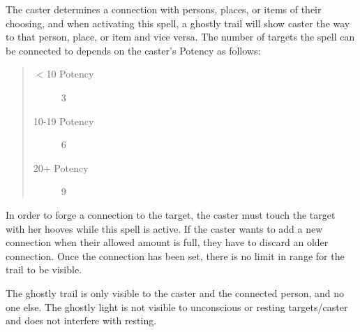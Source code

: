 \documentclass[11pt,a4paper,twocolumn]{book}
\begin{document}
\medskip

The caster determines a connection with persons, places, or items of their choosing, and when activating this spell, a ghostly trail will show caster the way to that person, place, or item and vice versa. The number of targets the spell can be connected to depends on the caster's Potency as follows:

\begin{quote}
	\begin{description}
		\item[$<$10 Potency] 	3
		\item[10-19 Potency] 	6
		\item[20+ Potency]  	9
	\end{description}	
\end{quote}

In order to forge a connection to the target, the caster must touch the target with her hooves while this spell is active. If the caster wants to add a new connection when their allowed amount is full, they have to discard an older connection. Once the connection has been set, there is no limit in range for the trail to be visible.

The ghostly trail is only visible to the caster and the connected person, and no one else. The ghostly light is not visible to unconscious or resting targets/caster and does not interfere with resting.

%	
%
%
%
\end{document}
